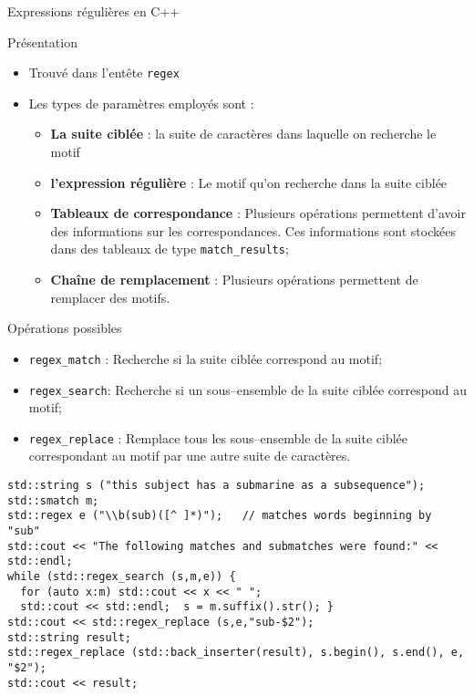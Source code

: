 \documentclass[handout,10pt]{beamer}
\begin{document}
\begin{frame}[fragile]{Expressions régulières en C++}
\tiny

\begin{block}{Présentation}
\begin{itemize}
 \item Trouvé dans l'entête \lstinline$regex$
 \item Les types de paramètres employés sont :
 \begin{itemize}
 \item \textbf{La suite ciblée} : la suite de caractères dans laquelle on recherche le motif
 \item \textbf{l'expression régulière} : Le motif qu'on recherche dans la suite ciblée
 \item \textbf{Tableaux de correspondance} : Plusieurs opérations permettent d'avoir des informations sur les correspondances. Ces informations sont stockées
 dans des tableaux de type \lstinline$match_results$;
 \item \textbf{Chaîne de remplacement} : Plusieurs opérations permettent de remplacer des motifs. 
 \end{itemize} 
\end{itemize}
\end{block}

\begin{block}{Opérations possibles}
\begin{itemize}
 \item \lstinline$regex_match$ : Recherche si la suite ciblée correspond au motif;
 \item \lstinline$regex_search$: Recherche si un sous--ensemble de la suite ciblée correspond au motif;
 \item \lstinline$regex_replace$ : Remplace tous les sous--ensemble de la suite ciblée correspondant au motif par une autre suite de caractères.
\end{itemize}
\begin{lstlisting}
std::string s ("this subject has a submarine as a subsequence");
std::smatch m;
std::regex e ("\\b(sub)([^ ]*)");   // matches words beginning by "sub"
std::cout << "The following matches and submatches were found:" << std::endl;
while (std::regex_search (s,m,e)) {
  for (auto x:m) std::cout << x << " ";
  std::cout << std::endl;  s = m.suffix().str(); }
std::cout << std::regex_replace (s,e,"sub-$2");
std::string result;
std::regex_replace (std::back_inserter(result), s.begin(), s.end(), e, "$2");
std::cout << result;
\end{lstlisting}

\end{block}
\end{frame}
\end{document}
